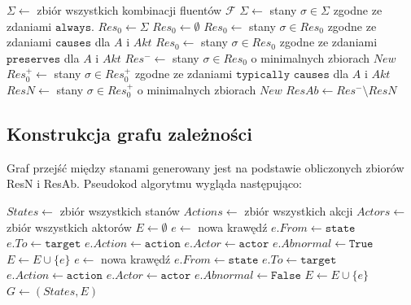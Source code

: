 \documentclass{article}
\begin{document}
\begin{algorithm}[H]
\begin{algorithmic}
\State $\Sigma \gets $ zbiór wszystkich kombinacji fluentów $\mathcal{F}$
\State $\Sigma \gets$ stany $\sigma \in \Sigma$ zgodne ze zdaniami $\texttt{always}$.
\State $Res_0 \gets \Sigma$
	\State $Res_0 \gets \emptyset$ 
\EndIf
\State $Res_0 \gets$ stany $\sigma \in Res_0$ zgodne ze zdaniami $\texttt{causes}$ dla $A$ i $Akt$
\State $Res_0 \gets$ stany $\sigma \in Res_0$ zgodne ze zdaniami $\texttt{preserves}$ dla $A$ i $Akt$
\State $Res^- \gets$ stany $\sigma \in Res_0$ o minimalnych zbiorach $New$
\State $Res^+_0 \gets$ stany $\sigma \in Res^+_0$ zgodne ze zdaniami $\texttt{typically causes}$ dla $A$ i $Akt$
\State $ResN \gets$ stany $\sigma \in Res^+_0$ o minimalnych zbiorach $New$
\State $ResAb \gets Res^- \setminus ResN$ 
\end{algorithmic}
\end{algorithm}

\newpage
\subsection{Konstrukcja grafu zależności}

Graf przejść między stanami generowany jest na podstawie obliczonych zbiorów ResN i ResAb. Pseudokod algorytmu wygląda następująco:

\begin{algorithm}[H]
\begin{algorithmic}
\State $States \gets $ zbiór wszystkich stanów
\State $Actions \gets $ zbiór wszystkich akcji
\State $Actors \gets $ zbiór wszystkich aktorów
\State $E \gets \emptyset$
				\State $e \gets$ nowa krawędź
				\State $e.From \gets \texttt{state}$
				\State $e.To \gets \texttt{target}$
				\State $e.Action \gets \texttt{action}$
				\State $e.Actor \gets \texttt{actor}$
				\State $e.Abnormal \gets \texttt{True}$
				\State $E \gets E \cup \{e\}$
			\EndFor
				\State $e \gets$ nowa krawędź
				\State $e.From \gets \texttt{state}$
				\State $e.To \gets \texttt{target}$
				\State $e.Action \gets \texttt{action}$
				\State $e.Actor \gets \texttt{actor}$
				\State $e.Abnormal \gets \texttt{False}$
				\State $E \gets E \cup \{e\}$
			\EndFor
		\EndFor
	\EndFor
\EndFor
\State $G \gets \left(States, E\right)$
\end{algorithmic}
\end{algorithm}\newpage
\end{document}
